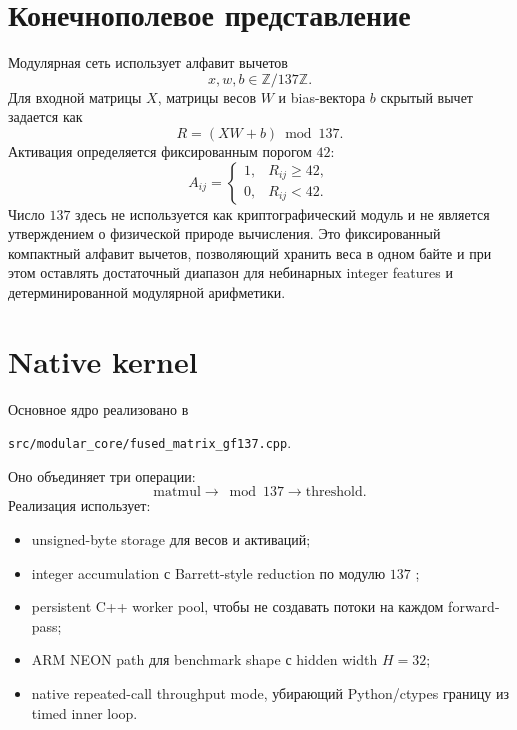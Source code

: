 \documentclass[11pt]{article}
\begin{document}
\section{Конечнополевое представление}

Модулярная сеть использует алфавит вычетов
\begin{equation}
    x,w,b \in \mathbb{Z}/137\mathbb{Z}.
\end{equation}
Для входной матрицы $X$, матрицы весов $W$ и bias-вектора $b$ скрытый вычет
задается как
\begin{equation}
    R = (XW+b)\bmod 137.
\end{equation}
Активация определяется фиксированным порогом $42$:
\begin{equation}
    A_{ij} =
    \begin{cases}
        1, & R_{ij}\ge 42,\\
        0, & R_{ij}<42.
    \end{cases}
\end{equation}
Число $137$ здесь не используется как криптографический модуль и не является
утверждением о физической природе вычисления. Это фиксированный компактный
алфавит вычетов, позволяющий хранить веса в одном байте и при этом оставлять
достаточный диапазон для небинарных integer features и детерминированной
модулярной арифметики.

\section{Native kernel}

Основное ядро реализовано в
\begin{center}
\texttt{src/modular\_core/fused\_matrix\_gf137.cpp}.
\end{center}
Оно объединяет три операции:
\begin{equation}
    \mathrm{matmul}
    \rightarrow
    \bmod 137
    \rightarrow
    \mathrm{threshold}.
\end{equation}
Реализация использует:
\begin{itemize}
    \item unsigned-byte storage для весов и активаций;
    \item integer accumulation с Barrett-style reduction по модулю $137$
    \cite{barrett1986};
    \item persistent C++ worker pool, чтобы не создавать потоки на каждом
    forward-pass;
    \item ARM NEON path \cite{armneon} для benchmark shape с hidden width
    $H=32$;
    \item native repeated-call throughput mode, убирающий Python/ctypes границу
    из timed inner loop.
\end{itemize}
\end{document}
